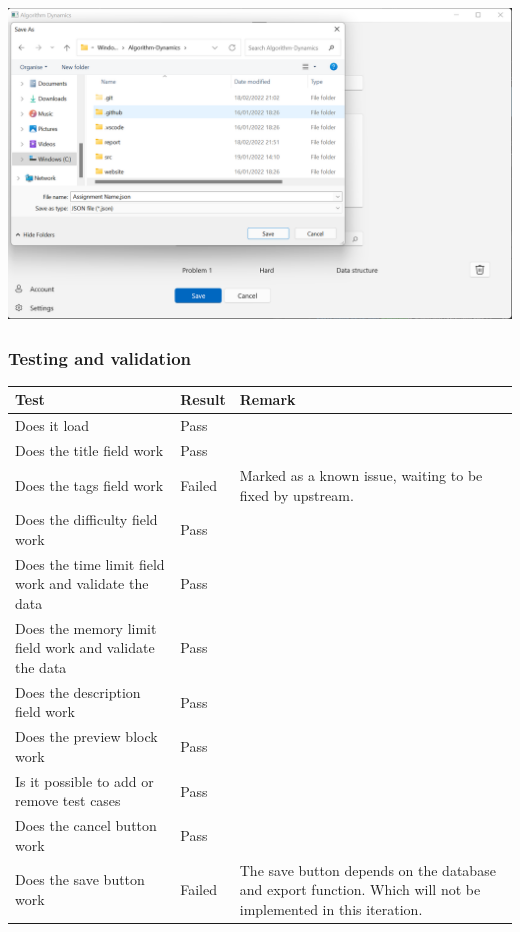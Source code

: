 \documentclass[a4paper]{report}
\begin{document}
\includegraphics[width=\textwidth, height=\textheight, keepaspectratio]{CreateNewProblemListPage-FilePicker}

\subsubsection{Testing and validation}

\begin{tabulary}{\linewidth}{|L|l|L|}
    \hline
    Test & Result & Remark \\
    \hline
    Does it load & Pass & \\
    \hline
    Does the title field work & Pass &  \\
    \hline
    Does the tags field work & Failed & Marked as a known issue, waiting to be fixed by upstream. \\
    \hline
    Does the difficulty field work & Pass & \\
    \hline
    Does the time limit field work and validate the data & Pass & \\
    \hline
    Does the memory limit field work and validate the data & Pass & \\
    \hline
    Does the description field work & Pass & \\
    \hline
    Does the preview block work & Pass & \\
    \hline
    Is it possible to add or remove test cases & Pass & \\
    \hline
    Does the cancel button work & Pass & \\
    \hline
    Does the save button work & Failed & The save button depends on the database and export function. Which will not be implemented in this iteration.
    \hline
\end{tabulary}
\end{document}
